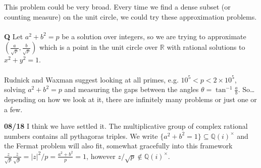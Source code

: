 \documentclass[12pt]{article}
\begin{document}
This problem could be very broad.  Every time we find a dense subset (or counting measure) on the unit circle, we could try these approximation problems. \\ \\
\textbf{Q} Let $a^2 + b^2 = p$ be a solution over integers, so we are trying to approximate $(\frac{a}{\sqrt{p}}, \frac{b}{\sqrt{p}})$ which is a point in the unit circle over $\mathbb{R}$ with rational solutions to $x^2 + y^2 = 1$.  \\ \\
Rudnick and Waxman suggest looking at all primes, e.g. $10^5 < p < 2 \times 10^5$, solving $a^2 + b^2 = p$ and measuring the gaps between the angles $\theta = \tan^{-1} \frac{a}{b}$.  So\dots depending on how we look at it, there are infinitely many problems or just one or a few. 

\newpage

\noindent \textbf{08/18} I think we have settled it.  The multiplicative group of complex rational numbers contains all pythagoras triples.  We write $\{ a^2 + b^2  = 1 \} \subseteq \mathbb{Q}(i)^\times $ and the Fermat problem will also fit, somewhat gracefully into this framework $ \frac{z}{\sqrt{p}} 
\frac{\overline{z}}{\sqrt{p}} = |z|^2 /p = \frac{a^2 + b^2}{p} = 1  $, however $z/\sqrt{p} \notin \mathbb{Q}(i)^\times$.
\end{document}
